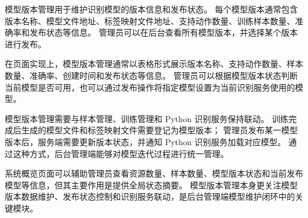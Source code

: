 模型版本管理用于维护识别模型的版本信息和发布状态。
每个模型版本通常包含版本名称、模型文件地址、标签映射文件地址、支持动作数量、训练样本数量、准确率和发布状态等信息。
管理员可以在后台查看所有模型版本，并选择某个版本进行发布。

在页面实现上，模型版本管理通常以表格形式展示版本名称、支持动作数量、样本数量、准确率、创建时间和发布状态等信息。
管理员可以根据模型版本状态判断当前模型是否可用，也可以通过发布操作将指定模型设置为当前识别服务使用的模型。

模型版本管理需要与样本管理、训练管理和 Python 识别服务保持联动。
训练完成后生成的模型文件和标签映射文件需要登记为模型版本；
管理员发布某一模型版本后，服务端需要更新版本状态，并通知 Python 识别服务加载对应模型。
通过这种方式，后台管理端能够对模型迭代过程进行统一管理。

系统概览页面可以辅助管理员查看资源数量、样本数量、模型版本状态和当前发布模型等信息，但其主要作用是提供全局状态摘要。
模型版本管理本身更关注模型版本数据维护、发布状态控制和识别服务联动，是后台管理端模型维护闭环中的关键模块。
